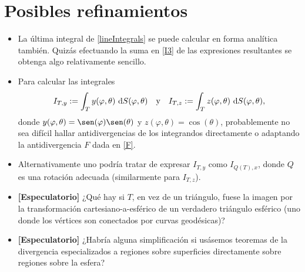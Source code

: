 \documentclass[reqno]{amsart}
\newcommand{\dd}[1][y]{\if#1y\,\fi{\mathrm d}} %
\begin{document}
\section{Posibles refinamientos}

\begin{itemize}[leftmargin=*]
\item La última integral de \eqref{lineIntegrals} se puede calcular en forma analítica también.
Quizás efectuando la suma en \eqref{I3} de las expresiones resultantes se obtenga algo relativamente sencillo.
\item Para calcular las integrales
%
\begin{equation*}
I_{T,y} := \int_T y(\varphi, \theta) \, \dd S(\varphi, \theta)
\quad\text{y}\quad
I_{T,z} := \int_T z(\varphi, \theta) \, \dd S(\varphi, \theta),
\end{equation*}
%
donde $y(\varphi, \theta) = \sen(\varphi) \sen(\theta)$ y $z(\varphi, \theta) = \cos(\theta)$, probablemente no sea difícil hallar antidivergencias de los integrandos directamente o adaptando la antidivergencia $F$ dada en \eqref{F}.
\item Alternativamente uno podría tratar de expresar $I_{T,y}$ como $I_{Q(T),x}$, donde $Q$ es una rotación adecuada (similarmente para $I_{T,z}$).
\item \textbf{[Especulatorio]} ¿Qué hay si $T$, en vez de un triángulo, fuese la imagen por la transformación cartesiano-a-esférico de un verdadero triángulo esférico (uno donde los vértices son conectados por curvas geodésicas)?
\item \textbf{[Especulatorio]} ¿Habría alguna simplificación si usásemos teoremas de la divergencia especializados a regiones sobre superficies directamente sobre regiones sobre la esfera?
\end{itemize}
\end{document}
